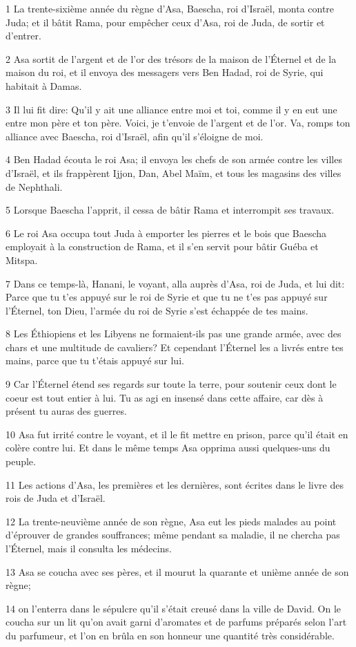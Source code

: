 \par 1 La trente-sixième année du règne d'Asa, Baescha, roi d'Israël, monta contre Juda; et il bâtit Rama, pour empêcher ceux d'Asa, roi de Juda, de sortir et d'entrer.
\par 2 Asa sortit de l'argent et de l'or des trésors de la maison de l'Éternel et de la maison du roi, et il envoya des messagers vers Ben Hadad, roi de Syrie, qui habitait à Damas.
\par 3 Il lui fit dire: Qu'il y ait une alliance entre moi et toi, comme il y en eut une entre mon père et ton père. Voici, je t'envoie de l'argent et de l'or. Va, romps ton alliance avec Baescha, roi d'Israël, afin qu'il s'éloigne de moi.
\par 4 Ben Hadad écouta le roi Asa; il envoya les chefs de son armée contre les villes d'Israël, et ils frappèrent Ijjon, Dan, Abel Maïm, et tous les magasins des villes de Nephthali.
\par 5 Lorsque Baescha l'apprit, il cessa de bâtir Rama et interrompit ses travaux.
\par 6 Le roi Asa occupa tout Juda à emporter les pierres et le bois que Baescha employait à la construction de Rama, et il s'en servit pour bâtir Guéba et Mitspa.
\par 7 Dans ce temps-là, Hanani, le voyant, alla auprès d'Asa, roi de Juda, et lui dit: Parce que tu t'es appuyé sur le roi de Syrie et que tu ne t'es pas appuyé sur l'Éternel, ton Dieu, l'armée du roi de Syrie s'est échappée de tes mains.
\par 8 Les Éthiopiens et les Libyens ne formaient-ils pas une grande armée, avec des chars et une multitude de cavaliers? Et cependant l'Éternel les a livrés entre tes mains, parce que tu t'étais appuyé sur lui.
\par 9 Car l'Éternel étend ses regards sur toute la terre, pour soutenir ceux dont le coeur est tout entier à lui. Tu as agi en insensé dans cette affaire, car dès à présent tu auras des guerres.
\par 10 Asa fut irrité contre le voyant, et il le fit mettre en prison, parce qu'il était en colère contre lui. Et dans le même temps Asa opprima aussi quelques-uns du peuple.
\par 11 Les actions d'Asa, les premières et les dernières, sont écrites dans le livre des rois de Juda et d'Israël.
\par 12 La trente-neuvième année de son règne, Asa eut les pieds malades au point d'éprouver de grandes souffrances; même pendant sa maladie, il ne chercha pas l'Éternel, mais il consulta les médecins.
\par 13 Asa se coucha avec ses pères, et il mourut la quarante et unième année de son règne;
\par 14 on l'enterra dans le sépulcre qu'il s'était creusé dans la ville de David. On le coucha sur un lit qu'on avait garni d'aromates et de parfums préparés selon l'art du parfumeur, et l'on en brûla en son honneur une quantité très considérable.

